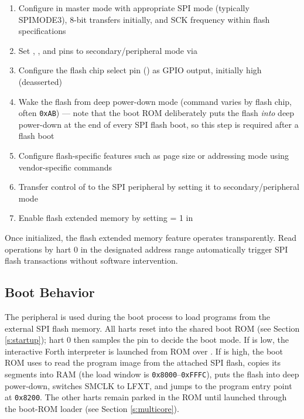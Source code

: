 \begin{enumerate}
	\item Configure  in master mode with appropriate SPI mode (typically SPIMODE3), 8-bit transfers initially, and SCK frequency within flash specifications
	\item Set , , and  pins to secondary/peripheral mode via 
	\item Configure the flash chip select pin () as GPIO output, initially high (deasserted)
	\item Wake the flash from deep power-down mode (command varies by flash chip, often \texttt{0xAB}) --- note that the boot ROM deliberately puts the flash \textit{into} deep power-down at the end of every SPI flash boot, so this step is required after a flash boot
	\item Configure flash-specific features such as page size or addressing mode using vendor-specific commands
	\item Transfer control of  to the SPI peripheral by setting it to secondary/peripheral mode
	\item Enable flash extended memory by setting  = 1 in 
\end{enumerate}

Once initialized, the flash extended memory feature operates transparently. Read operations by hart 0 in the designated address range automatically trigger SPI flash transactions without software intervention.



\subsection{ Boot Behavior}

The  peripheral is used during the boot process to load programs from the external SPI flash memory. All harts reset into the shared boot ROM (see Section \ref{s:startup}); hart 0 then samples the  pin to decide the boot mode. If  is low, the interactive Forth interpreter is launched from ROM over . If  is high, the boot ROM uses  to read the program image from the attached SPI flash, copies its segments into RAM (the load window is \texttt{0x8000}--\texttt{0xFFFC}), puts the flash into deep power-down, switches SMCLK to LFXT, and jumps to the program entry point at \texttt{0x8200}. The other harts remain parked in the ROM until launched through the boot-ROM loader (see Section \ref{s:multicore}).

